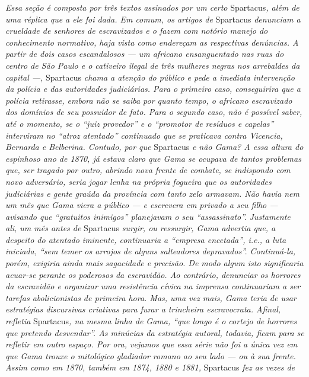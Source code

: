 \begin{argumento}
\emph{Essa seção é composta por três textos assinados por um certo}
Spartacus\emph{, além de uma réplica que a ele foi dada. Em comum, os
artigos de} Spartacus \emph{denunciam a crueldade de senhores de
escravizados e o fazem com notório manejo do conhecimento normativo,
haja vista como endereçam as respectivas denúncias. A partir de dois
casos escandalosos --- um africano ensanguentado nas ruas do centro de
São Paulo e o cativeiro ilegal de três mulheres negras nos arrebaldes da
capital ---,} Spartacus \emph{chama a atenção do público e pede a
imediata intervenção da polícia e das autoridades judiciárias. Para o
primeiro caso, conseguirira que a polícia retirasse, embora não se saiba
por quanto tempo, o africano escravizado dos domínios de seu possuidor
de fato. Para o segundo caso, não é possível saber, até o momento, se o
``juiz provedor'' e o ``promotor de resíduos e capelas'' interviram no
``atroz atentado'' continuado que se praticava contra Vicencia, Bernarda e
Belberina. Contudo, por que} Spartacus \emph{e não Gama? A essa altura
do espinhoso ano de 1870, já estava claro que Gama se ocupava de tantos
problemas que, ser tragado por outro, abrindo nova frente de combate, se
indispondo com novo adversário, seria jogar lenha na própria fogueira
que os autoridades judiciárias e gente graúda da província com tanto
zelo armavam. Não havia nem um mês que Gama viera a público --- e
escrevera em privado a seu filho --- avisando que ``gratuitos inimigos''
planejavam o seu ``assassinato''. Justamente ali, um mês antes de}
Spartacus \emph{surgir, ou ressurgir, Gama advertia que, a despeito do
atentado iminente, continuaria a ``empresa encetada'', i.e., a luta
iniciada, ``sem temer os arrojos de alguns salteadores depravados''.
Continuá-la, porém, exigiria ainda mais sagacidade e precisão. De modo
algum isto significaria acuar-se perante os poderosos da escravidão. Ao
contrário, denunciar os horrores da escravidão e organizar uma
resistência cívica na imprensa continuariam a ser tarefas abolicionistas
de primeira hora. Mas, uma vez mais, Gama teria de usar estratégias
discursivas criativas para furar a trincheira escravocrata. Afinal,
refletia} Spartacus\emph{, na mesma linha de Gama, ``que longo é o
cortejo de horrores que pretendo desvendar''. As minúcias da estratégia
autoral, todavia, ficam para se refletir em outro espaço. Por ora,
vejamos que essa série não foi a única vez em que Gama trouxe o
mitológico gladiador romano ao seu lado --- ou à sua frente. Assim como
em 1870, também em 1874, 1880 e 1881,} Spartacus \emph{fez as vezes de
}
\end{argumento}
